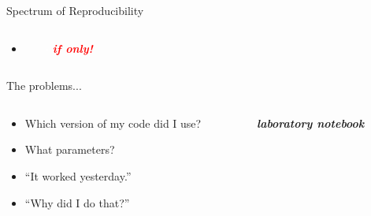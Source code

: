 \documentclass[xcolor=svgnames,11pt]{beamer}
\begin{document}
\begin{frame}{Spectrum of Reproducibility}
\begin{columns}[t]
\begin{column}[t]{0.5\textwidth}
    \begin{itemize}
      \item[]  \textcolor{white}{-----} 
         \textcolor{white}{-} \textcolor{red}{\textbf{\emph{if only!}}}
    \end{itemize}

  \end{column}
\end{columns}

\vspace{1cm}

\end{frame}


\begin{frame}{The problems...  }


  \large
  \begin{columns}
    \begin{column}{0.4\textwidth}
      \vspace{-1.6cm}
      \begin{itemize}[leftmargin=2pt]
        \itemsep18pt
        \item<1->[] Which version of my code did I use?
        \item<2->[] What parameters?
        \item<3->[] \enquote{It worked yesterday.}
        \item<4->[] \enquote{Why did I do that?}
      \end{itemize}
    \end{column}
    \begin{column}{0.55\textwidth}
      \vspace{-1.2cm}
      \begin{center}
        \textbf{\textit{laboratory notebook}}
      \end{center}
      \vspace{-0.75cm}
      \begin{figure}
        \centering


\end{figure}
\end{column}
\end{columns}
\end{frame}
\end{document}
